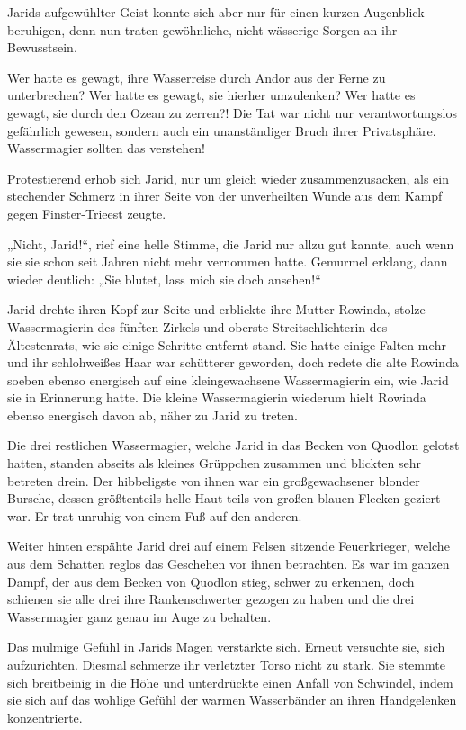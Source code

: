 Jarids aufgewühlter Geist konnte sich aber nur für einen kurzen Augenblick beruhigen, denn nun traten gewöhnliche, nicht-wässerige Sorgen an ihr Bewusstsein.

Wer hatte es gewagt, ihre Wasserreise durch Andor aus der Ferne zu unterbrechen? Wer hatte es gewagt, sie hierher umzulenken? Wer hatte es gewagt, sie durch den Ozean zu zerren?! Die Tat war nicht nur verantwortungslos gefährlich gewesen, sondern auch ein unanständiger Bruch ihrer Privatsphäre. Wassermagier sollten das verstehen!

Protestierend erhob sich Jarid, nur um gleich wieder zusammenzusacken, als ein stechender Schmerz in ihrer Seite von der unverheilten Wunde aus dem Kampf gegen Finster-Trieest zeugte.

„Nicht, Jarid!“, rief eine helle Stimme, die Jarid nur allzu gut kannte, auch wenn sie sie schon seit Jahren nicht mehr vernommen hatte. Gemurmel erklang, dann wieder deutlich: „Sie blutet, lass mich sie doch ansehen!“

Jarid drehte ihren Kopf zur Seite und erblickte ihre Mutter Rowinda, stolze Wassermagierin des fünften Zirkels und oberste Streitschlichterin des Ältestenrats, wie sie einige Schritte entfernt stand. Sie hatte einige Falten mehr und ihr schlohweißes Haar war schütterer geworden, doch redete die alte Rowinda soeben ebenso energisch auf eine kleingewachsene Wassermagierin ein, wie Jarid sie in Erinnerung hatte. Die kleine Wassermagierin wiederum hielt Rowinda ebenso energisch davon ab, näher zu Jarid zu treten.

Die drei restlichen Wassermagier, welche Jarid in das Becken von Quodlon gelotst hatten, standen abseits als kleines Grüppchen zusammen und blickten sehr betreten drein. Der hibbeligste von ihnen war ein großgewachsener blonder Bursche, dessen größtenteils helle Haut teils von großen blauen Flecken geziert war. Er trat unruhig von einem Fuß auf den anderen.

Weiter hinten erspähte Jarid drei auf einem Felsen sitzende Feuerkrieger, welche aus dem Schatten reglos das Geschehen vor ihnen betrachten. Es war im ganzen Dampf, der aus dem Becken von Quodlon stieg, schwer zu erkennen, doch schienen sie alle drei ihre Rankenschwerter gezogen zu haben und die drei Wassermagier ganz genau im Auge zu behalten.

Das mulmige Gefühl in Jarids Magen verstärkte sich. Erneut versuchte sie, sich aufzurichten. Diesmal schmerze ihr verletzter Torso nicht zu stark. Sie stemmte sich breitbeinig in die Höhe und unterdrückte einen Anfall von Schwindel, indem sie sich auf das wohlige Gefühl der warmen Wasserbänder an ihren Handgelenken konzentrierte.

